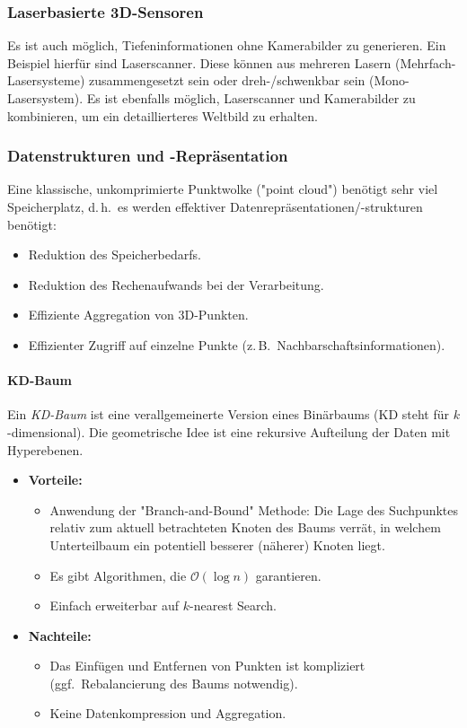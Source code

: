\documentclass[a4paper, 11pt, accentcolor = tud3b]{tudreport}
\renewcommand{\dh}{d.\,h.~}
\newcommand{\zB}{z.\,B.~}
\newcommand{\ggf}{ggf.~}
\begin{document}
				\subsubsection{Laserbasierte 3D-Sensoren}
					Es ist auch möglich, Tiefeninformationen ohne Kamerabilder zu generieren. Ein Beispiel hierfür sind Laserscanner. Diese können aus mehreren Lasern (Mehrfach-Lasersysteme) zusammengesetzt sein oder dreh-/schwenkbar sein (Mono-Lasersystem). Es ist ebenfalls möglich, Laserscanner und Kamerabilder zu kombinieren, um ein detaillierteres Weltbild zu erhalten.

				\subsubsection{Datenstrukturen und -Repräsentation}
					Eine klassische, unkomprimierte Punktwolke ("point cloud") benötigt sehr viel Speicherplatz, \dh es werden effektiver Datenrepräsentationen/-strukturen benötigt:
					\begin{itemize}
						\item Reduktion des Speicherbedarfs.
						\item Reduktion des Rechenaufwands bei der Verarbeitung.
						\item Effiziente Aggregation von 3D-Punkten.
						\item Effizienter Zugriff auf einzelne Punkte (\zB Nachbarschaftsinformationen).
					\end{itemize}

					\paragraph{KD-Baum}
						Ein \emph{KD-Baum} ist eine verallgemeinerte Version eines Binärbaums (KD steht für \(k\)-dimensional). Die geometrische Idee ist eine rekursive Aufteilung der Daten mit Hyperebenen.
						
						\begin{itemize}
							\item \textbf{Vorteile:}
								\begin{itemize}
									\item Anwendung der "Branch-and-Bound" Methode: Die Lage des Suchpunktes relativ zum aktuell betrachteten Knoten des Baums verrät, in welchem Unterteilbaum ein potentiell besserer (näherer) Knoten liegt.
									\item Es gibt Algorithmen, die \( \mathcal{O}(\log n) \) garantieren.
									\item Einfach erweiterbar auf \(k\)-nearest Search.
								\end{itemize}
							\item \textbf{Nachteile:}
								\begin{itemize}
									\item Das Einfügen und Entfernen von Punkten ist kompliziert (\ggf Rebalancierung des Baums notwendig).
									\item Keine Datenkompression und Aggregation.
								\end{itemize}
						\end{itemize}
\end{document}
